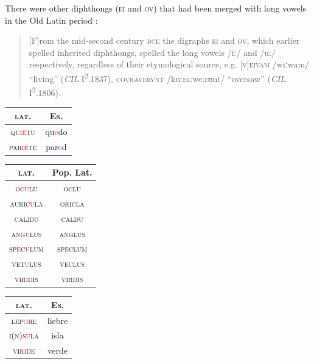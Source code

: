 \documentclass{report}[12pt]
\begin{document}
There were other diphthongs (\textsc{ei} and \textsc{ov}) that had been merged with long vowels in the Old Latin period \cite[p.~18]{companion_to_latin}:
\begin{quote}
  [F]rom the mid-second century \textsc{bce} the digraphs \textsc{ei} and \textsc{ov}, which earlier spelled inherited diphthongs, spelled the long vowels /iː/ and /uː/ respectively, regardless of their etymological source, e.g. \textsc{[v]eivam} /wiːwam/ ``living'' (\emph{CIL} I\textsuperscript{2}.1837), \textsc{covravervnt} /kuːraːweːrʊnt/ ``oversaw'' (\emph{CIL} I\textsuperscript{2}.1806).
\end{quote}

\begin{tcolorbox}[title=Loss of Hiatus]

\end{tcolorbox}

\begin{tabular}{c c}
  \textsc{lat.} & Es. \\
  \hline
  \textsc{qu\textcolor{red}{i\={e}}tu} & qu\textcolor{magenta}{e}do \\
  \textsc{par\textcolor{red}{i\u{e}}te} & par\textcolor{magenta}{e}d \\
\end{tabular}

\begin{tcolorbox}[title=Syncope]
  
\end{tcolorbox}

\begin{tabular}{c c}
  \textsc{lat.} & Pop. Lat. \\
  \hline
  \textsc{oc\textcolor{red}{u}lu} & \textsc{oclu} \\
  \textsc{auric\textcolor{red}{u}la} & \textsc{oricla} \\
  \textsc{cal\textcolor{red}{i}du} & \textsc{caldu} \\
  \textsc{ang\textcolor{red}{u}lus} & \textsc{anglus} \\
  \textsc{spec\textcolor{red}{u}lum} & \textsc{speclum} \\
  \textsc{vet\textcolor{red}{u}lus} & \textsc{veclus} \\
  \textsc{vir\textcolor{red}{i}dis} & \textsc{virdis} \\
\end{tabular}

\begin{tabular}{c c}
  \textsc{lat.} & Es. \\
  \hline
  \textsc{lep\textcolor{red}{o}re} & liebre \\
  \textsc{i(n)s\textcolor{red}{u}la} & isla \\
  \textsc{vir\textcolor{red}{i}de} & verde \\
\end{tabular}
\end{document}
